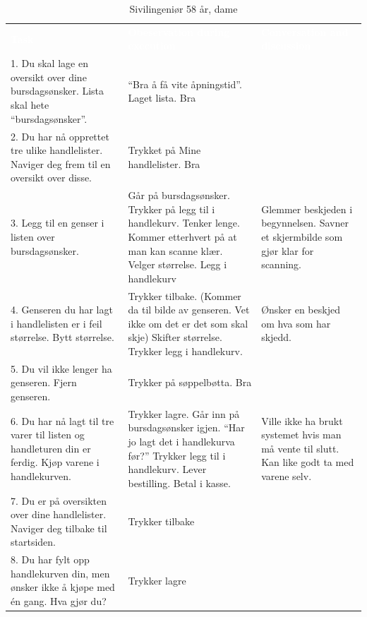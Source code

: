 \begin{table}[H]
    \caption{Sivilingeniør 58 år, dame}
    \label{tab:observasjon1_1}
    \centering
    \begin{tabular}{|L{15em}  L{15em} L{15em}|}
    \hline
        \textbf{\textcolor{white}{Task}} & \textbf{\textcolor{white}{Obeservation during execution}} & \textbf{\textcolor{white}{Conversation and discussion}}\\
        1. Du skal lage en oversikt over dine bursdagsønsker. Lista skal hete “bursdagsønsker”. & “Bra å få vite åpningstid”. Laget lista. Bra & \\
        2. Du har nå opprettet tre ulike handlelister. Naviger deg frem til en oversikt over disse. & Trykket på Mine handlelister. Bra &  \\
        3. Legg til en genser i listen over bursdagsønsker. & Går på bursdagsønsker. Trykker på legg til i handlekurv. Tenker lenge. Kommer etterhvert på at man kan scanne klær. Velger størrelse. Legg i handlekurv & Glemmer beskjeden i begynnelsen. Savner et skjermbilde som gjør klar for scanning.\\ 
        4. Genseren du har lagt i handlelisten er i feil størrelse. Bytt størrelse. & Trykker tilbake. (Kommer da til bilde av genseren. Vet ikke om det er det som skal skje) Skifter størrelse. Trykker legg i handlekurv. & Ønsker en beskjed om hva som har skjedd.\\
        5. Du vil ikke lenger ha genseren. Fjern genseren. & Trykker på søppelbøtta. Bra & \\
        6. Du har nå lagt til tre varer til listen og handleturen din er ferdig. Kjøp varene i handlekurven. & Trykker lagre. Går inn på bursdagsønsker igjen. “Har jo lagt det i handlekurva før?” Trykker legg til i handlekurv. Lever bestilling. Betal i kasse. & Ville ikke ha brukt systemet hvis man må vente til slutt. Kan like godt ta med varene selv.\\
        7. Du er på oversikten over dine handlelister. Naviger deg tilbake til startsiden. & Trykker tilbake & \\
        8. Du har fylt opp handlekurven din, men ønsker ikke å kjøpe med én gang. Hva gjør du? & Trykker lagre & \\
        \hline
    \end{tabular}
\end{table}

